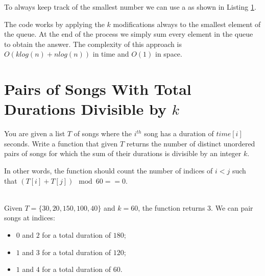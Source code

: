 To always keep track of the smallest number we can use a  as shown in Listing \ref{}.



The code works by applying the $k$ modifications always to the smallest element of the queue. At the end of the process we simply sum every element in the queue to obtain the answer. The complexity of this approach is $O(klog(n) + nlog(n))$ in time and $O(1)$ in space.



\section{Pairs of Songs With Total Durations Divisible by $k$}
\begin{exercise}
    You are given a list $T$ of songs where the $i^{th}$ song has a duration of $time[i]$ seconds.
    Write a function that given $T$ returns the number of distinct unordered pairs of songs for which the sum of their durations is divisible by an integer $k$.
    
    In other words,  the function should count the number of indices of $i < j$ such that $(T[i] + T[j]) \mod 60 == 0$.

     
    \begin{example}
        \label{ex:song_total_duration:example1}
        \hfill \\
        Given $T=\{30,20,150,100,40\}$ and $k=60$, the function returns $3$.
        We can pair songs at indices:
        \begin{itemize}
            \item $0$ and $2$ for a total duration of $180$;
             \item $1$ and $3$ for a total duration of $120$;
             \item $1$ and $4$ for a total duration of $60$.
        \end{itemize}
    \end{example}
    
    \end{exercise}
 

